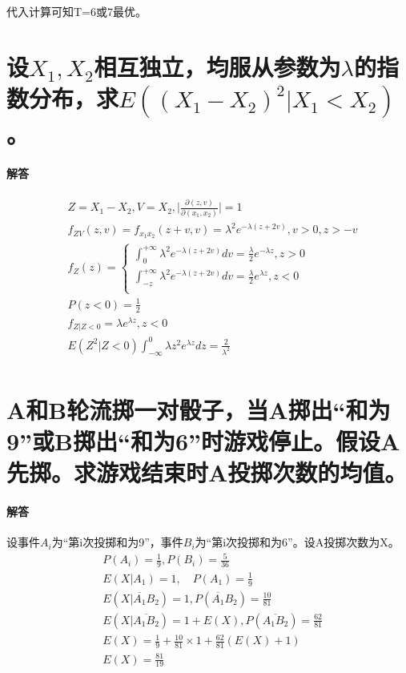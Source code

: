 \documentclass[UTF8]{ctexart}
\begin{document}
代入计算可知T=6或7最优。
\section{设$X_1,X_2$相互独立，均服从参数为$\lambda$的指数分布，求$E((X_1-X_2)^2\lvert X_1<X_2)$。}
\paragraph{解答}
\begin{equation*}
\begin{aligned}
&Z=X_1-X_2,V=X_2,\lvert\frac{\partial(z,v)}{\partial(x_1,x_2)}\rvert=1\\
&f_{ZV}(z,v)=f_{x_1x_2}(z+v,v)=\lambda^2e^{-\lambda(z+2v)},v>0,z>-v\\
&f_Z(z)=\begin{cases}
\int_0^{+\infty}\lambda^2e^{-\lambda(z+2v)}dv=\frac{\lambda}{2}e^{-\lambda z},z>0\\
\int_{-z}^{+\infty}\lambda^2e^{-\lambda(z+2v)}dv=\frac{\lambda}{2}e^{\lambda z},z<0\\
\end{cases}
\\
&P(z<0)=\frac{1}{2}\\
&f_{Z\lvert Z<0}=\lambda e^{\lambda z},z<0\\
&E(Z^2\lvert Z<0)\int_{-\infty}^0\lambda z^2e^{\lambda z}dz=\frac{2}{\lambda^2}\\
\end{aligned}
\end{equation*}
\section{A和B轮流掷一对骰子，当A掷出“和为9”或B掷出“和为6”时游戏停止。假设A先掷。求游戏结束时A投掷次数的均值。}
\paragraph{解答}
设事件$A_i$为“第i次投掷和为9”，事件$B_i$为“第i次投掷和为6”。设A投掷次数为X。
\begin{equation*}
\begin{aligned}
&P(A_i)=\frac{1}{9},P(B_i)=\frac{5}{36}\\
&E(X\lvert A_1)=1,\quad P(A_1)=\frac{1}{9}\\
&E(X\lvert \overline{A_1}B_2)=1,P(\overline{A_1}B_2)=\frac{10}{81}\\
&E(X\lvert \overline{A_1B_2})=1+E(X),P(\overline{A_1B_2})=\frac{62}{81}\\
&E(X)=\frac{1}{9}+\frac{10}{81}\times1+\frac{62}{81}(E(X)+1)\\
&E(X)=\frac{81}{19}\\
\end{aligned}
\end{equation*}
\end{document}
